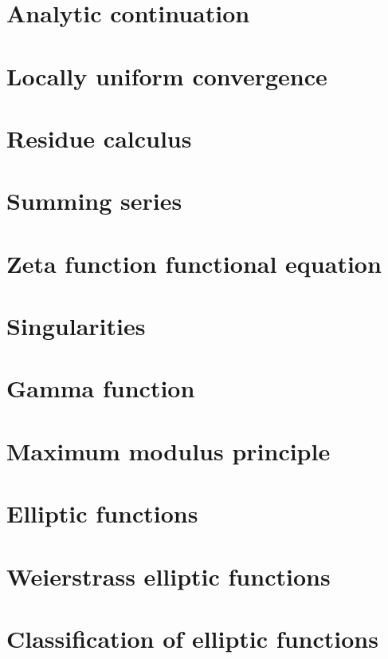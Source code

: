 \documentclass{article}
\begin{document}
\section{Analytic continuation}
\section{Locally uniform convergence}
\section{Residue calculus}
\section{Summing series}
\section{Zeta function functional equation}
\section{Singularities}
\section{Gamma function}
\section{Maximum modulus principle}
\section{Elliptic functions}
\section{Weierstrass elliptic functions}
\section{Classification of elliptic functions}
\end{document}
